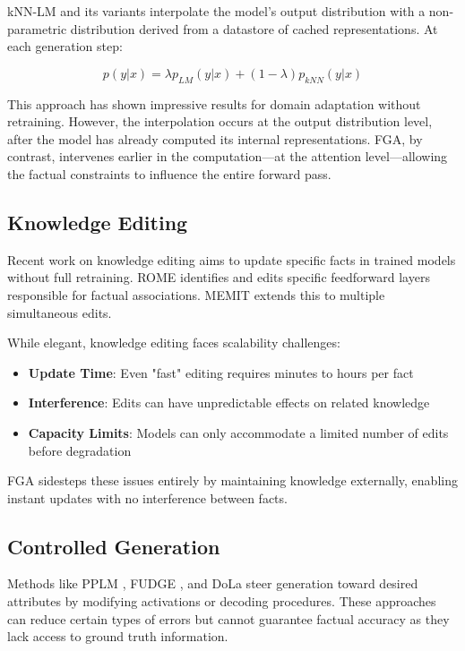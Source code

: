 \documentclass[11pt, a4paper]{article}
\theoremstyle{definition}
\begin{document}
kNN-LM \cite{khandelwal2019generalization} and its variants interpolate the model's output distribution with a non-parametric distribution derived from a datastore of cached representations. At each generation step:

$$p(y|x) = \lambda p_{LM}(y|x) + (1-\lambda) p_{kNN}(y|x)$$

This approach has shown impressive results for domain adaptation without retraining. However, the interpolation occurs at the output distribution level, after the model has already computed its internal representations. FGA, by contrast, intervenes earlier in the computation—at the attention level—allowing the factual constraints to influence the entire forward pass.

\subsection{Knowledge Editing}

Recent work on knowledge editing \cite{mitchell2021fast, meng2022locating} aims to update specific facts in trained models without full retraining. ROME \cite{meng2022locating} identifies and edits specific feedforward layers responsible for factual associations. MEMIT \cite{meng2023memit} extends this to multiple simultaneous edits.

While elegant, knowledge editing faces scalability challenges:
\begin{itemize}
    \item \textbf{Update Time}: Even "fast" editing requires minutes to hours per fact
    \item \textbf{Interference}: Edits can have unpredictable effects on related knowledge
    \item \textbf{Capacity Limits}: Models can only accommodate a limited number of edits before degradation
\end{itemize}

FGA sidesteps these issues entirely by maintaining knowledge externally, enabling instant updates with no interference between facts.

\subsection{Controlled Generation}

Methods like PPLM \cite{dathathri2019plug}, FUDGE \cite{yang2021fudge}, and DoLa \cite{chuang2023dola} steer generation toward desired attributes by modifying activations or decoding procedures. These approaches can reduce certain types of errors but cannot guarantee factual accuracy as they lack access to ground truth information.
\end{document}
